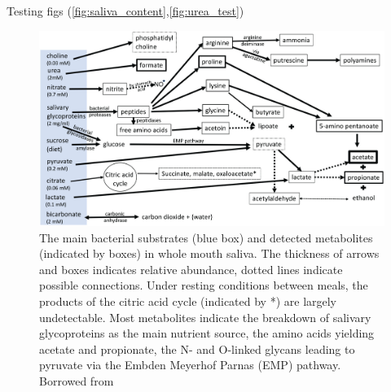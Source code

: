 Testing figs (\autoref{fig:saliva_content},\autoref{fig:urea_test})

\begin{figure}[!ht]
    \centering
    \includegraphics[width=1\linewidth]{./figure/saliva_content.jpeg}
    \caption{The main bacterial substrates (blue box) and detected metabolites (indicated by boxes) in whole mouth saliva. 
    The thickness of arrows and boxes indicates relative abundance, dotted lines indicate possible connections. 
    Under resting conditions between meals, the products of the citric acid cycle (indicated by *) are largely undetectable. 
    Most metabolites indicate the breakdown of salivary glycoproteins as the main nutrient source, the amino acids 
    yielding acetate and propionate, the N- and O-linked glycans leading to pyruvate via the Embden Meyerhof Parnas (EMP) pathway. 
    Borrowed from  \cite{Carpenter2020}}
    \label{fig:saliva_content}
\end{figure}

